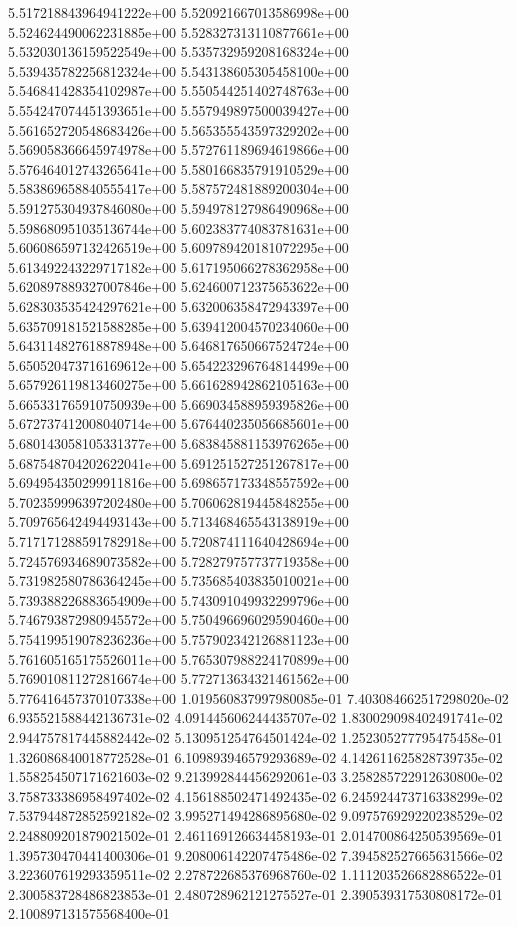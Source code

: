5.517218843964941222e+00
5.520921667013586998e+00
5.524624490062231885e+00
5.528327313110877661e+00
5.532030136159522549e+00
5.535732959208168324e+00
5.539435782256812324e+00
5.543138605305458100e+00
5.546841428354102987e+00
5.550544251402748763e+00
5.554247074451393651e+00
5.557949897500039427e+00
5.561652720548683426e+00
5.565355543597329202e+00
5.569058366645974978e+00
5.572761189694619866e+00
5.576464012743265641e+00
5.580166835791910529e+00
5.583869658840555417e+00
5.587572481889200304e+00
5.591275304937846080e+00
5.594978127986490968e+00
5.598680951035136744e+00
5.602383774083781631e+00
5.606086597132426519e+00
5.609789420181072295e+00
5.613492243229717182e+00
5.617195066278362958e+00
5.620897889327007846e+00
5.624600712375653622e+00
5.628303535424297621e+00
5.632006358472943397e+00
5.635709181521588285e+00
5.639412004570234060e+00
5.643114827618878948e+00
5.646817650667524724e+00
5.650520473716169612e+00
5.654223296764814499e+00
5.657926119813460275e+00
5.661628942862105163e+00
5.665331765910750939e+00
5.669034588959395826e+00
5.672737412008040714e+00
5.676440235056685601e+00
5.680143058105331377e+00
5.683845881153976265e+00
5.687548704202622041e+00
5.691251527251267817e+00
5.694954350299911816e+00
5.698657173348557592e+00
5.702359996397202480e+00
5.706062819445848255e+00
5.709765642494493143e+00
5.713468465543138919e+00
5.717171288591782918e+00
5.720874111640428694e+00
5.724576934689073582e+00
5.728279757737719358e+00
5.731982580786364245e+00
5.735685403835010021e+00
5.739388226883654909e+00
5.743091049932299796e+00
5.746793872980945572e+00
5.750496696029590460e+00
5.754199519078236236e+00
5.757902342126881123e+00
5.761605165175526011e+00
5.765307988224170899e+00
5.769010811272816674e+00
5.772713634321461562e+00
5.776416457370107338e+00
1.019560837997980085e-01
7.403084662517298020e-02
6.935521588442136731e-02
4.091445606244435707e-02
1.830029098402491741e-02
2.944757817445882442e-02
5.130951254764501424e-02
1.252305277795475458e-01
1.326086840018772528e-01
6.109893946579293689e-02
4.142611625828739735e-02
1.558254507171621603e-02
9.213992844456292061e-03
3.258285722912630800e-02
3.758733386958497402e-02
4.156188502471492435e-02
6.245924473716338299e-02
7.537944872852592182e-02
3.995271494286895680e-02
9.097576929220238529e-02
2.248809201879021502e-01
2.461169126634458193e-01
2.014700864250539569e-01
1.395730470441400306e-01
9.208006142207475486e-02
7.394582527665631566e-02
3.223607619293359511e-02
2.278722685376968760e-02
1.111203526682886522e-01
2.300583728486823853e-01
2.480728962121275527e-01
2.390539317530808172e-01
2.100897131575568400e-01
